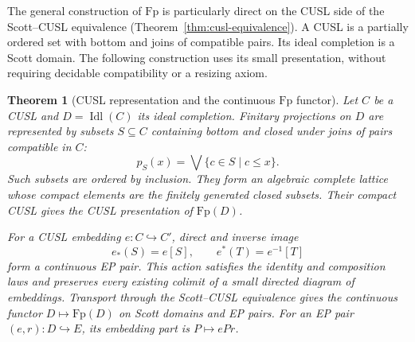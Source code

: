 \documentclass[11pt,a4paper]{article}
\newtheorem{theorem}{Theorem}[section]
\theoremstyle{definition}
\theoremstyle{remark}
\newcommand{\lub}{\bigvee}
\begin{document}
The general construction of $\mathrm{Fp}$ is particularly direct on the
CUSL side of the Scott--CUSL equivalence
(Theorem~\ref{thm:cusl-equivalence}). A CUSL is a partially ordered set
with bottom and joins of compatible pairs. Its ideal completion is a
Scott domain. The following construction uses its small presentation,
without requiring decidable compatibility or a resizing axiom.

\begin{theorem}[CUSL representation and the continuous $\mathrm{Fp}$ functor]
\label{thm:fp-cusl}
Let $C$ be a CUSL and $D=\operatorname{Idl}(C)$ its ideal completion.
Finitary projections on $D$ are represented by subsets $S\subseteq C$
containing bottom and closed under joins of pairs compatible in $C$:
\[
 p_S(x)=\lub\{c\in S\mid c\leq x\}.
\]
Such subsets are ordered by inclusion. They form an algebraic complete
lattice whose compact elements are the finitely generated closed
subsets. Their compact CUSL gives the CUSL presentation of
$\mathrm{Fp}(D)$.

For a CUSL embedding $e:C\hookrightarrow C'$, direct and inverse image
\[
 e_*(S)=e[S],\qquad e^*(T)=e^{-1}[T]
\]
form a continuous EP pair. This action satisfies the identity and
composition laws and preserves every existing colimit of a small
directed diagram of embeddings. Transport through the Scott--CUSL
equivalence gives the continuous functor $D\mapsto\mathrm{Fp}(D)$ on
Scott domains and EP pairs. For an EP pair $(e,r):D\hookrightarrow E$,
its embedding part is $P\mapsto ePr$.
\end{theorem}
\end{document}
